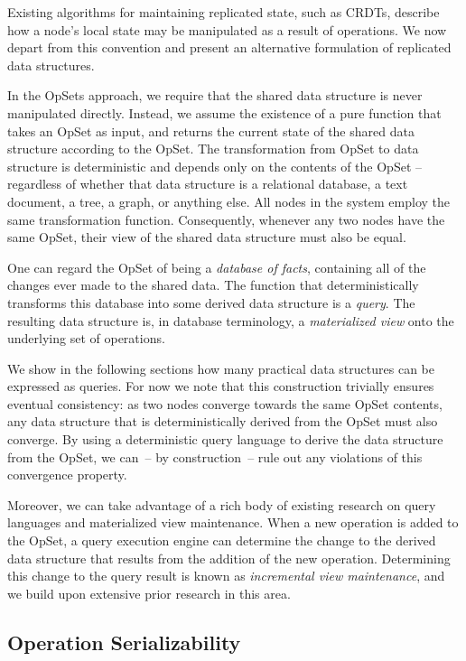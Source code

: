 Existing algorithms for maintaining replicated state, such as CRDTs, describe how a node's local state may be manipulated as a result of operations.
We now depart from this convention and present an alternative formulation of replicated data structures.

In the OpSets approach, we require that the shared data structure is never manipulated directly.
Instead, we assume the existence of a pure function that takes an OpSet as input, and returns the current state of the shared data structure according to the OpSet.
The transformation from OpSet to data structure is deterministic and depends only on the contents of the OpSet -- regardless of whether that data structure is a relational database, a text document, a tree, a graph, or anything else.
All nodes in the system employ the same transformation function.
Consequently, whenever any two nodes have the same OpSet, their view of the shared data structure must also be equal.

One can regard the OpSet of being a \emph{database of facts}, containing all of the changes ever made to the shared data.
The function that deterministically transforms this database into some derived data structure is a \emph{query}.
The resulting data structure is, in database terminology, a \emph{materialized view} onto the underlying set of operations.

We show in the following sections how many practical data structures can be expressed as queries.
For now we note that this construction trivially ensures eventual consistency: as two nodes converge towards the same OpSet contents, any data structure that is deterministically derived from the OpSet must also converge.
By using a deterministic query language to derive the data structure from the OpSet, we can~-- by construction~-- rule out any violations of this convergence property.

Moreover, we can take advantage of a rich body of existing research on query languages and materialized view maintenance.
When a new operation is added to the OpSet, a query execution engine can determine the change to the derived data structure that results from the addition of the new operation.
Determining this change to the query result is known as \emph{incremental view maintenance}, and we build upon extensive prior research in this area.

\subsection{Operation Serializability}\label{sec:op-serial}

